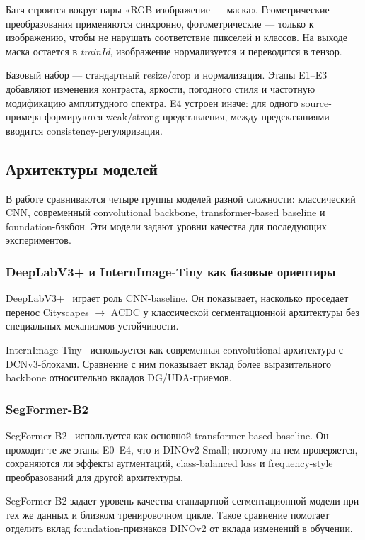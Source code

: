 \documentclass[14pt,a4paper]{extarticle}
\begin{document}
Батч строится вокруг пары «RGB-изображение --- маска». Геометрические преобразования применяются синхронно, фотометрические --- только к изображению, чтобы не нарушать соответствие пикселей и классов. На выходе маска остается в \textit{trainId}, изображение нормализуется и переводится в тензор.

Базовый набор --- стандартный resize/crop и нормализация. Этапы E1--E3 добавляют изменения контраста, яркости, погодного стиля и частотную модификацию амплитудного спектра. E4 устроен иначе: для одного source-примера формируются weak/strong-представления, между предсказаниями вводится consistency-регуляризация.

\subsection{Архитектуры моделей}

В работе сравниваются четыре группы моделей разной сложности: классический CNN, современный convolutional backbone, transformer-based baseline и foundation-бэкбон. Эти модели задают уровни качества для последующих экспериментов.

\subsubsection{DeepLabV3+ и InternImage-Tiny как базовые ориентиры}

DeepLabV3+~\cite{chen2018deeplabv3plus} играет роль CNN-baseline. Он показывает, насколько проседает перенос Cityscapes $\rightarrow$ ACDC у классической сегментационной архитектуры без специальных механизмов устойчивости.

InternImage-Tiny~\cite{wang2023internimage} используется как современная convolutional архитектура с DCNv3-блоками. Сравнение с ним показывает вклад более выразительного backbone относительно вкладов DG/UDA-приемов.

\subsubsection{SegFormer-B2}

SegFormer-B2~\cite{xie2021segformer} используется как основной transformer-based baseline. Он проходит те же этапы E0--E4, что и DINOv2-Small; поэтому на нем проверяется, сохраняются ли эффекты аугментаций, class-balanced loss и frequency-style преобразований для другой архитектуры.

SegFormer-B2 задает уровень качества стандартной сегментационной модели при тех же данных и близком тренировочном цикле. Такое сравнение помогает отделить вклад foundation-признаков DINOv2 от вклада изменений в обучении.
\end{document}
